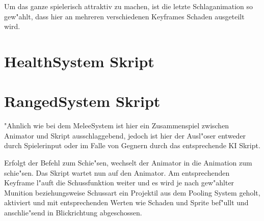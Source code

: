 Um das ganze spielerisch attraktiv zu machen, ist die letzte Schlaganimation so gew"ahlt, dass hier an mehreren verschiedenen Keyframes Schaden ausgeteilt wird.


\section{HealthSystem Skript}

\section{RangedSystem Skript}
"Ahnlich wie bei dem MeleeSystem ist hier ein Zusammenspiel zwischen Animator und Skript ausschlaggebend, jedoch ist hier der Ausl"oser entweder durch Spielerinput oder im Falle von Gegnern durch das entsprechende KI Skript.\newline

Erfolgt der Befehl zum Schie"sen, wechselt der Animator in die Animation zum schie"sen. Das Skript wartet nun auf den Animator. Am entsprechenden Keyframe l"auft die Schussfunktion weiter und es wird je nach gew"ahlter Munition beziehungsweise Schussart ein Projektil aus dem Pooling System geholt, aktiviert und mit entsprechenden Werten wie Schaden und Sprite bef"ullt und anschlie"send in Blickrichtung abgeschossen.
